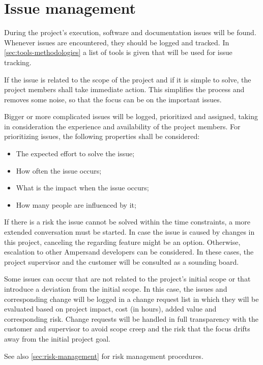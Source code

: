 
\section{Issue management}
\label{sec:issue-management}
During the project's execution, software and documentation issues will be found.
Whenever issues are encountered, they should be logged and tracked.
In \autoref{sec:tools-methodologies} a list of tools is given that will be used for issue tracking.

If the issue is related to the scope of the project and if it is simple to solve, the project members shall take immediate action.
This simplifies the process and removes some noise, so that the focus can be on the important issues.

Bigger or more complicated issues will be logged, prioritized and assigned, taking in consideration the experience and availability of the project members.
For prioritizing issues, the following properties shall be considered:
\begin{itemize}
	\item The expected effort to solve the issue;
	\item How often the issue occurs;
	\item What is the impact when the issue occurs;
	\item How many people are influenced by it;
\end{itemize}

If there is a risk the issue cannot be solved within the time constraints, a more extended conversation must be started.
In case the issue is caused by changes in this project, canceling the regarding feature might be an option.
Otherwise, escalation to other Ampersand developers can be considered.
In these cases, the project supervisor and the customer will be consulted as a sounding board.

Some issues can occur that are not related to the project's initial scope or that introduce a deviation from the initial scope.
In this case, the issues and corresponding change will be logged in a change request list in which they will be evaluated based on project impact, cost (in hours), added value and corresponding risk. 
Change requests will be handled in full transparency with the customer and supervisor to avoid scope creep and the risk that the focus drifts away from the initial project goal.

See also \autoref{sec:risk-management} for risk management procedures.
